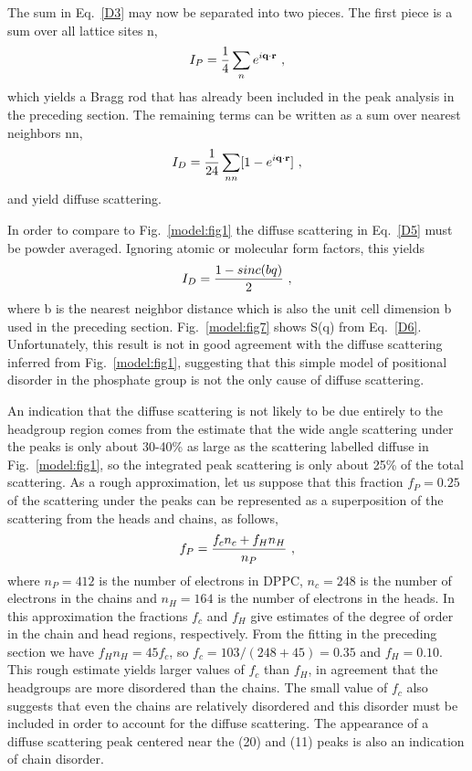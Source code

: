 The sum in Eq.\ \ref{D3} may now be separated into two pieces.  The first piece
is a sum over all lattice sites n,
\begin{equation}
\label{D4}
I_{P} = \frac{1}{4} \sum_{n} e^{i {\bf q} \cdot {\bf r}}~,
\end{equation}
which yields a Bragg rod that has already been included in the peak analysis in
the preceding section.  The remaining terms can be written as
a sum over nearest neighbors nn,
\begin{equation}
\label{D5}
I_{D} = \frac{1}{24} \sum_{nn} [1 - e^{i {\bf q} \cdot {\bf r} }]~,
\end{equation}
and yield diffuse scattering.

In order to compare to Fig.\ \ref{model:fig1} the diffuse scattering in Eq.\ \ref{D5} must
be powder averaged.  Ignoring atomic or molecular form factors, this yields 
\begin{equation}
\label{D6}
I_{D} = {1 - sinc(bq) \over 2}~,
\end{equation}
where b is the nearest neighbor distance which is also the
unit cell dimension b used in the preceding section.  Fig.\ \ref{model:fig7} shows
S(q) from Eq.\ \ref{D6}.  Unfortunately, this result is not in good agreement with
the diffuse scattering inferred from Fig.\ \ref{model:fig1}, suggesting that this simple
model of positional disorder in the phosphate group is not the only cause
of diffuse scattering.  

An indication that the diffuse scattering is not likely to be due 
entirely to the headgroup region comes from the
estimate that the wide angle scattering under the peaks is
only about 30-40\% as large as the scattering labelled diffuse
in Fig.\ \ref{model:fig1}, so the integrated peak scattering is only about 25\% of the
total scattering.  As a rough approximation, let us suppose that 
this fraction $f_{P}=0.25$ of the scattering under the peaks can be
represented as a superposition of the scattering from the heads and
chains, as follows,
\begin{equation}
\label{D1}
f_{P} = { f_{c}n_{c}+f_{H}n_{H} \over n_{P}}~,
\end{equation}
where $n_{P}=412$ is the number of electrons in DPPC,
$n_{c}=248$ is the number of electrons in the chains and $n_{H}=164$ is the
number of electrons in the heads.  In this approximation the fractions
$f_{c}$ and $f_{H}$ give estimates of the degree of order in the chain
and head regions, respectively.
From the fitting in the preceding section we have $f_{H} n_{H}=45 f_{c}$,
so $f_{c}=103/(248+45)=0.35$ and $f_{H}=0.10$.
This rough estimate yields larger values of $f_{c}$ than $f_{H}$, in
agreement that the headgroups are more disordered than the chains.
The small value of $f_{c}$ also suggests that even the chains
are relatively disordered and this disorder must be included in order to account
for the diffuse scattering.  The appearance of a diffuse scattering
peak centered near the (20) and (11) peaks is also an indication 
of chain disorder.
